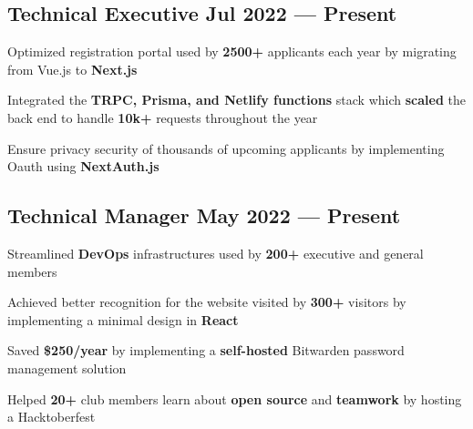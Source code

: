 \subsection{{Technical Executive \hfill Jul 2022 --- Present}}
\begin{zitemize}
\item Optimized registration portal used by \textbf{2500+} applicants each year by migrating from Vue.js to \textbf{Next.js}
\item Integrated the \textbf{TRPC, Prisma, and Netlify functions} stack which \textbf{scaled} the back end to handle \textbf{10k+} requests throughout the year
\item Ensure privacy security of thousands of upcoming applicants by implementing Oauth using \textbf{NextAuth.js}
\end{zitemize}

\vspace{0.3cm}\subsection{{Technical Manager  \hfill May 2022 --- Present}}
\begin{zitemize}
\item Streamlined \textbf{DevOps} infrastructures used by \textbf{200+} executive and general members
\item Achieved better recognition for the website visited by \textbf{300+} visitors by implementing a minimal design in \textbf{React}
\item Saved \textbf{\$250/year} by implementing a \textbf{self-hosted} Bitwarden password management solution
\item Helped \textbf{20+} club members learn about \textbf{open source} and \textbf{teamwork} by hosting a Hacktoberfest
\end{zitemize}


